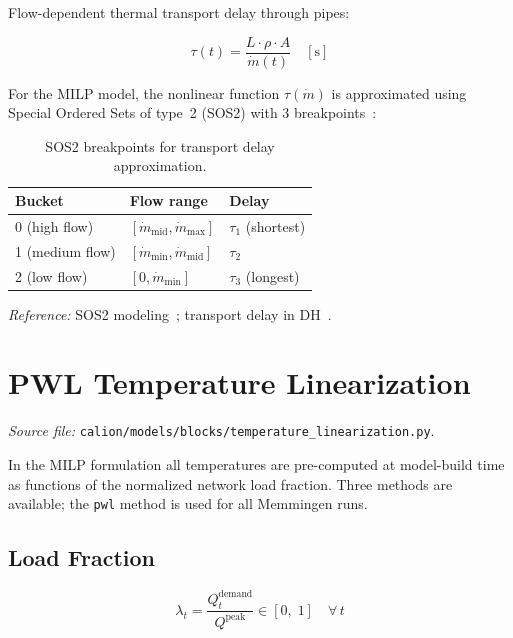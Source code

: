 \documentclass[a4paper,12pt]{article}
\begin{document}
Flow-dependent thermal transport delay through pipes:

\begin{equation}
  \tau(t) = \frac{L \cdot \rho \cdot A}{\dot{m}(t)}
  \quad [\text{s}]
  \tag{PH-7}
  \label{eq:ph7}
\end{equation}

For the MILP model, the nonlinear function $\tau(\dot{m})$ is approximated using Special
Ordered Sets of type~2 (SOS2) with 3 breakpoints~\cite{Williams2013}:

\begin{table}[h!]
  \centering
  \caption{SOS2 breakpoints for transport delay approximation.}
  \begin{tabular}{@{}lll@{}}
    \toprule
    Bucket & Flow range & Delay \\
    \midrule
    0 (high flow)   & $[\dot{m}_{\text{mid}}, \dot{m}_{\text{max}}]$ & $\tau_1$ (shortest) \\
    1 (medium flow) & $[\dot{m}_{\text{min}}, \dot{m}_{\text{mid}}]$ & $\tau_2$ \\
    2 (low flow)    & $[0, \dot{m}_{\text{min}}]$                    & $\tau_3$ (longest) \\
    \bottomrule
  \end{tabular}
  \label{tab:sos2}
\end{table}

\noindent\textit{Reference:} SOS2 modeling~\cite{Beale1970}; transport delay in
DH~\cite{Schweiger2017}.

\section{PWL Temperature Linearization}
\label{sec:pwl}

\textit{Source file:} \texttt{calion/models/blocks/temperature\_linearization.py}.

In the MILP formulation all temperatures are pre-computed at model-build time as
functions of the normalized network load fraction.  Three methods are available;
the \texttt{pwl} method is used for all Memmingen runs.

\subsection{Load Fraction}

\begin{equation}
  \lambda_{t}
  = \frac{Q^{\text{demand}}_{t}}{Q^{\text{peak}}}
  \in [0,\;1]
  \quad \forall\, t
  \tag{PWL-1}
  \label{eq:pwl1}
\end{equation}
\end{document}
